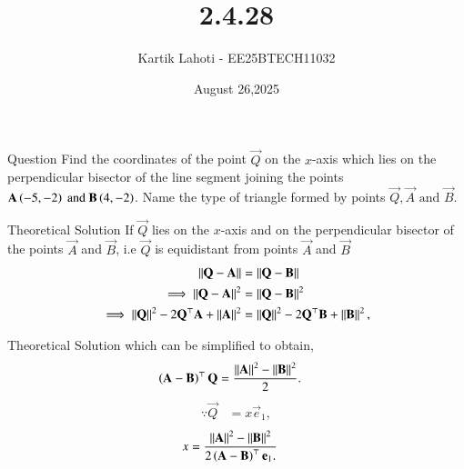 \documentclass{beamer}
\title %
{2.4.28}
\date{August 26,2025}
\author 
{Kartik Lahoti - EE25BTECH11032}
\begin{document}
\frame{\titlepage}
\begin{frame}{Question}
Find the coordinates of the point $\vec{Q}$ on the $x$-axis which lies on the perpendicular bisector of the line segment joining the points $\mathbf{A} \left(-5,-2\right) \text{ and } \mathbf{B} \left(4,-2\right)$. Name the type of triangle formed by points $\vec{Q}, \vec{A} \text{ and } \vec{B}$.
\end{frame}



% 

\begin{frame}{Theoretical Solution}
 If $\vec{Q}$ lies on the  $x$-axis and on the perpendicular bisector of the points $\vec{A}$ and $\vec{B}$, i.e $\vec{Q}$ is equidistant from points $\vec{A}$ and $\vec{B}$
\begin{align}
 \left\lVert\mathbf{Q}-\mathbf{A}\right\rVert &=
\left\lVert\mathbf{Q}-\mathbf{B}\right\rVert 
\\
 \implies \left\lVert\mathbf{Q}-\mathbf{A}\right\rVert^2 &=
\left\lVert\mathbf{Q}-\mathbf{B}\right\rVert^2 
\\
 \implies \left\lVert\mathbf{Q}\right\rVert^2-2{\mathbf{Q}}^{\top}\mathbf{A} + \left\lVert\mathbf{A}\right\rVert^2
	&= \left\lVert\mathbf{Q}\right\rVert^2-2{\mathbf{Q}}^{\top}\mathbf{B} + \left\lVert\mathbf{B}\right\rVert^2,
\end{align}
\end{frame}

\begin{frame}{Theoretical Solution}
which can be simplified to obtain, 
  \begin{align}
	  \left(\mathbf{A}-\mathbf{B}\right)^\top   \mathbf{Q}&=\frac{\left\lVert\mathbf{A}\right\rVert^2 -\left\lVert\mathbf{B}\right\rVert^2 }{2}.
  \end{align}
  \begin{align}
  \because \vec{Q} &= x\vec{e}_1,
  \end{align}
  \begin{align}
   x &=\frac{\left\lVert\mathbf{A}\right\rVert^2 -\left\lVert\mathbf{B}\right\rVert^2 }{2\left(\mathbf{A}-\mathbf{B}\right)^{\top }\mathbf{e}_1.}
  \end{align} 
  
\end{frame}
\end{document}
